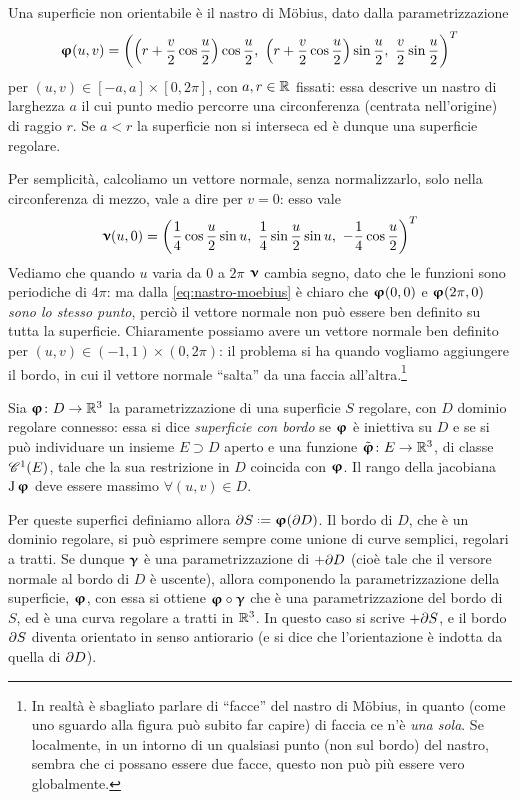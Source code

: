 Una superficie non orientabile è il nastro di M\"obius, dato dalla parametrizzazione
\begin{equation}
	\vphi(u,v)=\bigg(
		\Big(r+\dfrac{v}2\cos\dfrac{u}2\Big)\cos\dfrac{u}2,\
		\Big(r+\dfrac{v}2\cos\dfrac{u}2\Big)\sin\dfrac{u}2,\
		\dfrac{v}2\sin\dfrac{u}2
	\bigg)^T
	\label{eq:nastro-moebius}
\end{equation}
per $(u,v)\in[-a,a]\times[0,2\pi]$, con $a,r\in\R$ fissati: essa descrive un nastro di larghezza $a$ il cui punto medio percorre una circonferenza (centrata nell'origine) di raggio $r$.
Se $a<r$ la superficie non si interseca ed è dunque una superficie regolare.

Per semplicità, calcoliamo un vettore normale, senza normalizzarlo, solo nella circonferenza di mezzo, vale a dire per $v=0$: esso vale
\begin{equation}
	\vnu(u,0)=\bigg(
		\dfrac14\cos\dfrac{u}2\sin u,\
		\dfrac14\sin\dfrac{u}2\sin u,\
		-\dfrac14\cos\dfrac{u}2
	\bigg)^T
	\label{eq:vettore-normale-centro-nastro-mobius}
\end{equation}
Vediamo che quando $u$ varia da 0 a $2\pi$ $\vnu$ cambia segno, dato che le funzioni sono periodiche di $4\pi$: ma dalla \eqref{eq:nastro-moebius} è chiaro che $\vphi(0,0)$ e $\vphi(2\pi,0)$ \emph{sono lo stesso punto}, perciò il vettore normale non può essere ben definito su tutta la superficie.
Chiaramente possiamo avere un vettore normale ben definito per $(u,v)\in(-1,1)\times(0,2\pi)$: il problema si ha quando vogliamo aggiungere il bordo, in cui il vettore normale ``salta'' da una faccia all'altra.\footnote{
	In realtà è sbagliato parlare di ``facce'' del nastro di M\"obius, in quanto (come uno sguardo alla figura può subito far capire) di faccia ce n'è \emph{una sola}.
	Se localmente, in un intorno di un qualsiasi punto (non sul bordo) del nastro, sembra che ci possano essere due facce, questo non può più essere vero globalmente.
}

\begin{definizione} \label{d:superfici-con-bordo}
	Sia $\vphi\colon D\to\R^3$ la parametrizzazione di una superficie $S$ regolare, con $D$ dominio regolare connesso: essa si dice \emph{superficie con bordo} se $\vphi$ è iniettiva su $D$ e se si può individuare un insieme $E\supset D$ aperto e una funzione $\tilde{\vphi}\colon E\to\R^3$, di classe $\cont[1]{E}$, tale che la sua restrizione in $D$ coincida con $\vphi$. Il rango della jacobiana $\jac\vphi$ deve essere massimo $\forall (u,v)\in D$.
\end{definizione}
Per queste superfici definiamo allora $\boundary S\defeq\vphi(\boundary D)$.
Il bordo di $D$, che è un dominio regolare, si può esprimere sempre come unione di curve semplici, regolari a tratti.
Se dunque $\vgamma$ è una parametrizzazione di $+\boundary D$ (cioè tale che il versore normale al bordo di $D$ è uscente), allora componendo la parametrizzazione della superficie, $\vphi$, con essa si ottiene $\vphi\circ\vgamma$ che è una parametrizzazione del bordo di $S$, ed è una curva regolare a tratti in $\R^3$.
In questo caso si scrive $+\boundary S$, e il bordo $\boundary S$ diventa orientato in senso antiorario (e si dice che l'orientazione è indotta da quella di $\boundary D$).

